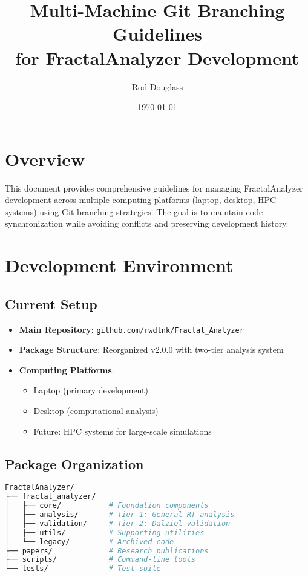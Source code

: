 \documentclass[11pt,letterpaper]{article}
\title{\textbf{Multi-Machine Git Branching Guidelines\\for FractalAnalyzer Development}}
\author{Rod Douglass}
\date{\today}
\begin{document}
\maketitle

\section{Overview}

This document provides comprehensive guidelines for managing FractalAnalyzer development across multiple computing platforms (laptop, desktop, HPC systems) using Git branching strategies. The goal is to maintain code synchronization while avoiding conflicts and preserving development history.

\section{Development Environment}

\subsection{Current Setup}
\begin{itemize}
    \item \textbf{Main Repository}: \texttt{github.com/rwdlnk/Fractal\_Analyzer}
    \item \textbf{Package Structure}: Reorganized v2.0.0 with two-tier analysis system
    \item \textbf{Computing Platforms}: 
    \begin{itemize}
        \item Laptop (primary development)
        \item Desktop (computational analysis)
        \item Future: HPC systems for large-scale simulations
    \end{itemize}
\end{itemize}

\subsection{Package Organization}
\begin{lstlisting}[language=bash]
FractalAnalyzer/
├── fractal_analyzer/
│   ├── core/           # Foundation components
│   ├── analysis/       # Tier 1: General RT analysis
│   ├── validation/     # Tier 2: Dalziel validation
│   ├── utils/          # Supporting utilities
│   └── legacy/         # Archived code
├── papers/             # Research publications
├── scripts/            # Command-line tools
└── tests/              # Test suite
\end{lstlisting}
\end{document}
